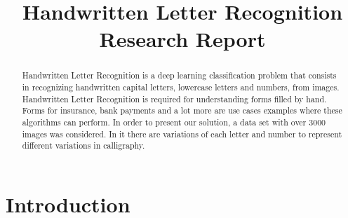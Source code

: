 \documentclass[conference]{IEEEtran}
\begin{document}
\title{Handwritten Letter Recognition\\
Research Report}


\author{
\and
{}
}

\maketitle

\thispagestyle{plain}
\pagestyle{plain}

\begin{abstract}

Handwritten Letter Recognition is a deep learning classification problem that consists in recognizing handwritten capital letters, lowercase letters and numbers, from images. Handwritten Letter Recognition is required for understanding forms filled by hand. Forms for insurance, bank payments and a lot more are use cases examples where these algorithms can perform. In order to present our solution, a data set with over 3000 images was considered. In it there are variations of each letter and number to represent different variations in calligraphy.

\end{abstract}

\section{Introduction}
\end{document}
